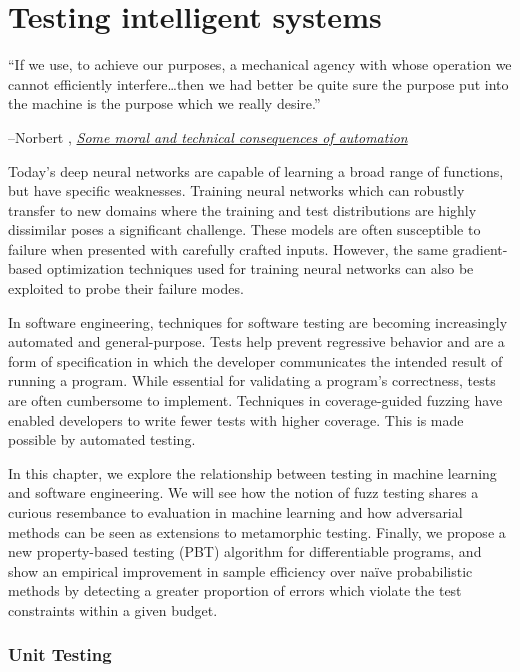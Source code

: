 \chapter{Testing intelligent systems}\label{ch:difftest}

\setlength{\epigraphwidth}{0.80\textwidth}
\epigraph{``If we use, to achieve our purposes, a mechanical agency with whose operation we cannot efficiently interfere\ldots then we had better be quite sure the purpose put into the machine is the purpose which we really desire.''}{\begin{flushright}--Norbert \citet{wiener1960some}, \href{https://www.ias.ac.in/article/fulltext/reso/004/01/0080-0088}{\textit{Some moral and technical consequences of automation}}~\end{flushright}}

Today's deep neural networks are capable of learning a broad range of functions, but have specific weaknesses. Training neural networks which can robustly transfer to new domains where the training and test distributions are highly dissimilar poses a significant challenge. These models are often susceptible to failure when presented with carefully crafted inputs. However, the same gradient-based optimization techniques used for training neural networks can also be exploited to probe their failure modes.

In software engineering, techniques for software testing are becoming increasingly automated and general-purpose. Tests help prevent regressive behavior and are a form of specification in which the developer communicates the intended result of running a program. While essential for validating a program's correctness, tests are often cumbersome to implement. Techniques in coverage-guided fuzzing have enabled developers to write fewer tests with higher coverage. This is made possible by automated testing.

In this chapter, we explore the relationship between testing in machine learning and software engineering. We will see how the notion of fuzz testing shares a curious resembance to evaluation in machine learning and how adversarial methods can be seen as extensions to metamorphic testing. Finally, we propose a new property-based testing (PBT) algorithm for differentiable programs, and show an empirical improvement in sample efficiency over na\"ive probabilistic methods by detecting a greater proportion of errors which violate the test constraints within a given budget.

\subsection{Unit Testing}

